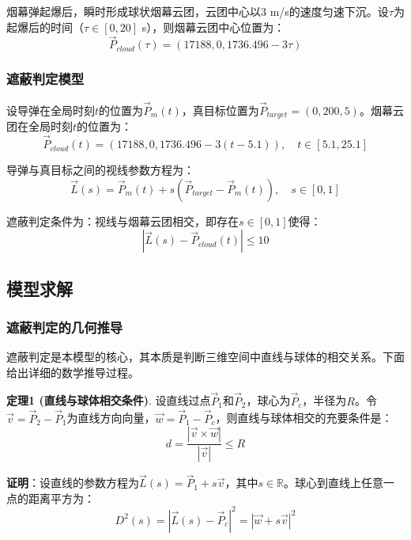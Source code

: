 \documentclass[12pt,a4paper]{article}
\begin{document}
\indent 烟幕弹起爆后，瞬时形成球状烟幕云团，云团中心以3 m/s的速度匀速下沉。设$\tau$为起爆后的时间（$\tau \in [0, 20]$ s），则烟幕云团中心位置为：
\begin{equation}
\vec{P}_{cloud}(\tau) = (17188, 0, 1736.496 - 3\tau)
\end{equation}

\subsubsection{遮蔽判定模型}

\indent 设导弹在全局时刻$t$的位置为$\vec{P}_m(t)$，真目标位置为$\vec{P}_{target} = (0, 200, 5)$。烟幕云团在全局时刻$t$的位置为：
\begin{equation}
\vec{P}_{cloud}(t) = (17188, 0, 1736.496 - 3(t - 5.1)), \quad t \in [5.1, 25.1]
\end{equation}

\indent 导弹与真目标之间的视线参数方程为：
\begin{equation}
\vec{L}(s) = \vec{P}_m(t) + s(\vec{P}_{target} - \vec{P}_m(t)), \quad s \in [0, 1]
\end{equation}

\indent 遮蔽判定条件为：视线与烟幕云团相交，即存在$s \in [0, 1]$使得：
\begin{equation}
|\vec{L}(s) - \vec{P}_{cloud}(t)| \leq 10
\end{equation}

\subsection{模型求解}

\subsubsection{遮蔽判定的几何推导}

\indent 遮蔽判定是本模型的核心，其本质是判断三维空间中直线与球体的相交关系。下面给出详细的数学推导过程。

\noindent\textbf{定理1 (直线与球体相交条件)}. 设直线过点$\vec{P}_1$和$\vec{P}_2$，球心为$\vec{P}_c$，半径为$R$。令$\vec{v} = \vec{P}_2 - \vec{P}_1$为直线方向向量，$\vec{w} = \vec{P}_1 - \vec{P}_c$，则直线与球体相交的充要条件是：
\begin{equation}
d = \frac{|\vec{v} \times \vec{w}|}{|\vec{v}|} \leq R
\end{equation}

\noindent\textbf{证明}：设直线的参数方程为$\vec{L}(s) = \vec{P}_1 + s\vec{v}$，其中$s \in \mathbb{R}$。球心到直线上任意一点的距离平方为：
\begin{equation}
D^2(s) = |\vec{L}(s) - \vec{P}_c|^2 = |\vec{w} + s\vec{v}|^2
\end{equation}
\end{document}
